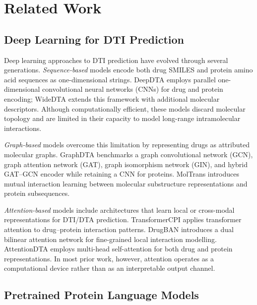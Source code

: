 \documentclass[fleqn,10pt]{wlscirep}
\begin{document}
\section{Related Work}
\label{sec:related}

\subsection{Deep Learning for DTI Prediction}

Deep learning approaches to DTI prediction have evolved through several
generations.\cite{wen2017deep}  \emph{Sequence-based} models encode both
drug SMILES and protein amino acid sequences as one-dimensional strings.
DeepDTA\cite{ozturk2018deepdta} employs parallel one-dimensional convolutional
neural networks (CNNs) for drug and
protein encoding; WideDTA\cite{ozturk2019widedta} extends this framework
with additional molecular descriptors.  Although computationally efficient, these
models discard molecular topology and are limited in their capacity to model
long-range intramolecular interactions.

\emph{Graph-based} models overcome this limitation by representing drugs as
attributed molecular graphs.  GraphDTA\cite{nguyen2021graphdta} benchmarks a
graph convolutional network (GCN), graph attention network (GAT), graph
isomorphism network (GIN), and hybrid GAT--GCN encoder while retaining a CNN
for proteins.  MolTrans\cite{huang2021moltrans} introduces mutual
interaction learning between molecular substructure representations and protein
subsequences.

\emph{Attention-based} models include architectures that learn local or
cross-modal representations for DTI/DTA prediction.
TransformerCPI\cite{chen2020transformercpi} applies transformer attention to
drug--protein interaction patterns.  DrugBAN\cite{bai2023drugban} introduces
a dual bilinear attention network for fine-grained local interaction modelling.
AttentionDTA\cite{zhao2022attentiondta} employs multi-head self-attention for
both drug and protein representations.  In most prior work, however, attention
operates as a computational device rather than as an interpretable output channel.

\subsection{Pretrained Protein Language Models}
\end{document}
